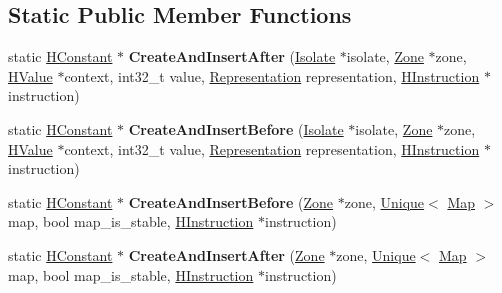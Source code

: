\subsection*{Static Public Member Functions}
\begin{DoxyCompactItemize}
\item 
static \hyperlink{classv8_1_1internal_1_1_h_constant}{H\+Constant} $\ast$ {\bfseries Create\+And\+Insert\+After} (\hyperlink{classv8_1_1internal_1_1_isolate}{Isolate} $\ast$isolate, \hyperlink{classv8_1_1internal_1_1_zone}{Zone} $\ast$zone, \hyperlink{classv8_1_1internal_1_1_h_value}{H\+Value} $\ast$context, int32\+\_\+t value, \hyperlink{classv8_1_1internal_1_1_representation}{Representation} representation, \hyperlink{classv8_1_1internal_1_1_h_instruction}{H\+Instruction} $\ast$instruction)\hypertarget{classv8_1_1internal_1_1_h_constant_aa67849db875a4bca3b88ed159f71af88}{}\label{classv8_1_1internal_1_1_h_constant_aa67849db875a4bca3b88ed159f71af88}

\item 
static \hyperlink{classv8_1_1internal_1_1_h_constant}{H\+Constant} $\ast$ {\bfseries Create\+And\+Insert\+Before} (\hyperlink{classv8_1_1internal_1_1_isolate}{Isolate} $\ast$isolate, \hyperlink{classv8_1_1internal_1_1_zone}{Zone} $\ast$zone, \hyperlink{classv8_1_1internal_1_1_h_value}{H\+Value} $\ast$context, int32\+\_\+t value, \hyperlink{classv8_1_1internal_1_1_representation}{Representation} representation, \hyperlink{classv8_1_1internal_1_1_h_instruction}{H\+Instruction} $\ast$instruction)\hypertarget{classv8_1_1internal_1_1_h_constant_a0edde3ddb2f76bcf69bc5e4b8d511983}{}\label{classv8_1_1internal_1_1_h_constant_a0edde3ddb2f76bcf69bc5e4b8d511983}

\item 
static \hyperlink{classv8_1_1internal_1_1_h_constant}{H\+Constant} $\ast$ {\bfseries Create\+And\+Insert\+Before} (\hyperlink{classv8_1_1internal_1_1_zone}{Zone} $\ast$zone, \hyperlink{classv8_1_1internal_1_1_unique}{Unique}$<$ \hyperlink{classv8_1_1internal_1_1_map}{Map} $>$ map, bool map\+\_\+is\+\_\+stable, \hyperlink{classv8_1_1internal_1_1_h_instruction}{H\+Instruction} $\ast$instruction)\hypertarget{classv8_1_1internal_1_1_h_constant_a09d7cebc9d1094c95f0f3a4db5a65a27}{}\label{classv8_1_1internal_1_1_h_constant_a09d7cebc9d1094c95f0f3a4db5a65a27}

\item 
static \hyperlink{classv8_1_1internal_1_1_h_constant}{H\+Constant} $\ast$ {\bfseries Create\+And\+Insert\+After} (\hyperlink{classv8_1_1internal_1_1_zone}{Zone} $\ast$zone, \hyperlink{classv8_1_1internal_1_1_unique}{Unique}$<$ \hyperlink{classv8_1_1internal_1_1_map}{Map} $>$ map, bool map\+\_\+is\+\_\+stable, \hyperlink{classv8_1_1internal_1_1_h_instruction}{H\+Instruction} $\ast$instruction)\hypertarget{classv8_1_1internal_1_1_h_constant_a50312141e759c2a6ec6d05c0ef79b54f}{}\label{classv8_1_1internal_1_1_h_constant_a50312141e759c2a6ec6d05c0ef79b54f}

\end{DoxyCompactItemize}
